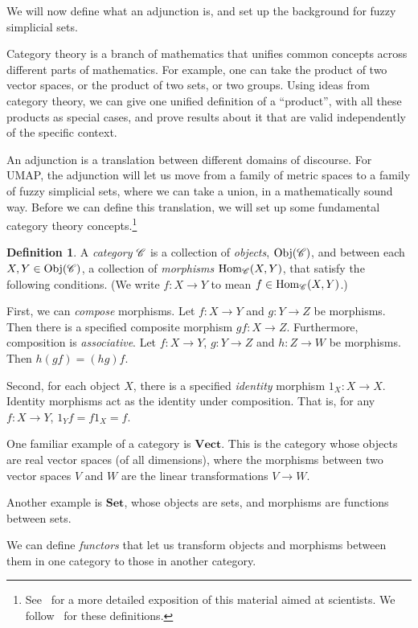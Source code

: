 \documentclass[a4paper,12pt,leqno]{article} \usepackage{amsmath}
\newcommand{\Hom}{\ensuremath{\operatorname{Hom}}}
\newcommand{\Obj}{\ensuremath{\operatorname{Obj}}}
\theoremstyle{definition}
\newtheorem{defn}{Definition}
\begin{document}
We will now define what an adjunction is, and set up the background for fuzzy
simplicial sets.

Category theory is a branch of mathematics that unifies common concepts across
different parts of mathematics.
For example, one can take the product of two vector spaces, or the product of
two sets, or two groups.
Using ideas from category theory, we can give one unified definition of a
``product'', with all these products as special cases, and prove results about
it that are valid independently of the specific context.

An adjunction is a translation between different domains of discourse.
For UMAP, the adjunction will let us move from a family of metric spaces to
a family of fuzzy simplicial sets, where we can take a union, in
a mathematically sound way.
Before we can define this translation, we will set up some fundamental category
theory concepts.\footnote{
  See~\cite{Spivak18} for a more detailed exposition of this material aimed at
  scientists.  We follow~\cite{Riehl} for these definitions.
}

\begin{defn}
  A \emph{category} $\mathscr{C}$ is a collection of \emph{objects}, $\Obj(\curC)$,
  and between each $X, Y\in\Obj(\curC)$, a collection of \emph{morphisms}
  $\Hom_{\curC}(X, Y)$, that satisfy the following conditions.
  (We write $f: X\to Y$ to mean $f\in \Hom_{\curC}(X, Y)$.)

  First, we can \emph{compose} morphisms.
  Let $f: X\to Y$ and $g: Y\to Z$ be morphisms.
  Then there is a specified composite morphism $gf: X\to Z$.
  Furthermore, composition is \emph{associative}.
  Let $f: X\to Y$, $g: Y\to Z$ and $h: Z\to W$ be morphisms.
  Then $h(gf) = (hg)f$.

  Second, for each object $X$, there is a specified \emph{identity} morphism
  $1_X: X\to X$.
  Identity morphisms act as the identity under composition.
  That is, for any $f: X\to Y$, $1_Yf = f1_X = f$.
\end{defn}

One familiar example of a category is $\textbf{Vect}$.
This is the category whose objects are real vector spaces (of all dimensions),
where the morphisms between two vector spaces $V$ and $W$ are the linear
transformations $V\to W$.

Another example is $\textbf{Set}$, whose objects are sets, and morphisms are
functions between sets.

We can define \emph{functors} that let us transform objects and morphisms between them in
one category to those in another category.
\end{document}

